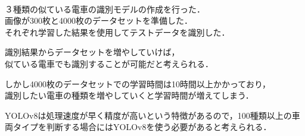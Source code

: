 
\begin{description}
	\item [似ている電車の識別] ~\\
	\item ３種類の似ている電車の識別モデルの作成を行った．\\
	画像が300枚と4000枚のデータセットを準備した．\\
	それぞれ学習した結果を使用してテストデータを識別した．
	\href{run:./fig/hikaku/hikaku_demo.mp4}{\textcolor[hsb]{0.0, 0.7, 1.0}{\faPlayCircle[regular]}}\\
	\newpage
	
	\item 識別結果からデータセットを増やしていけば，\\似ている電車でも識別することが可能だと考えられる．
	\item しかし4000枚のデータセットでの学習時間は10時間以上かかっており，\\識別したい電車の種類を増やしていくと学習時間が増えてしまう．
	\item YOLOv8は処理速度が早く精度が高いという特徴があるので，100種類以上の車両タイプを判断する場合にはYOLOv8を使う必要があると考えられる．
\end{description}


